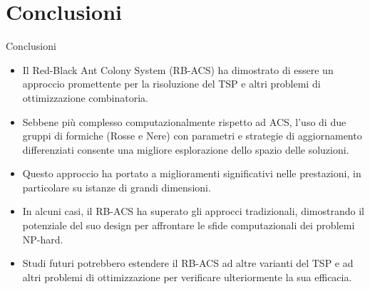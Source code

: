 \documentclass{beamer}
\begin{document}
\section{Conclusioni}
\begin{frame}{Conclusioni}
    \begin{itemize}
        \item Il Red-Black Ant Colony System (RB-ACS) ha dimostrato di essere un approccio promettente per la risoluzione del TSP e altri problemi di ottimizzazione combinatoria.
        \item Sebbene più complesso computazionalmente rispetto ad ACS, l'uso di due gruppi di formiche (Rosse e Nere) con parametri e strategie di aggiornamento differenziati consente una migliore esplorazione dello spazio delle soluzioni.
        \item Questo approccio ha portato a miglioramenti significativi nelle prestazioni, in particolare su istanze di grandi dimensioni.
        \item In alcuni casi, il RB-ACS ha superato gli approcci tradizionali, dimostrando il potenziale del suo design per affrontare le sfide computazionali dei problemi NP-hard.
        \item Studi futuri potrebbero estendere il RB-ACS ad altre varianti del TSP e ad altri problemi di ottimizzazione per verificare ulteriormente la sua efficacia.
    \end{itemize}
\end{frame}
\end{document}

